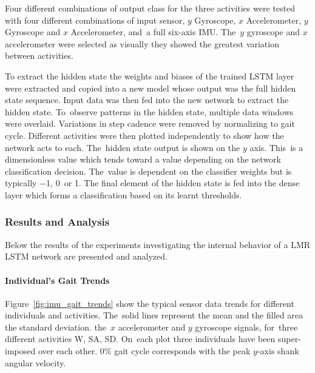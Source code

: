 Four different combinations of output class for the three activities were tested with four different combinations of input sensor, $y$ Gyroscope, $x$ Accelerometer, $y$ Gyroscope and $x$ Accelerometer, and~a full six-axis IMU. The~$y$ gyroscope and $x$ accelerometer were selected as visually they showed the greatest variation between activities.

To extract the hidden state the weights and biases of the trained LSTM layer were extracted and copied into a new model whose output was the full hidden state sequence. Input data was then fed into the new network to extract the hidden state. To~observe patterns in the hidden state, multiple data windows were overlaid. Variations in step cadence were removed by normalizing to gait cycle. Different activities were then plotted independently to show how the network acts to each. The~hidden state output is shown on the $y$ axis. This~is a dimensionless value which tends toward a value depending on the network classification decision. The~value is dependent on the classifier weights but is typically $-$1, 0~or 1.  The final element of the hidden state is fed into the dense layer which forms a classification based on its learnt thresholds.


\subsubsection{Results and Analysis}
Below the results of the experiments investigating the internal behavior of a LMR LSTM network are presented and analyzed.

\paragraph{Individual's Gait Trends}
Figure~\ref{fig:imu_gait_trends} show the typical sensor data trends for different individuals and activities. The~solid lines represent the mean and the filled area the standard deviation. the~$x$ accelerometer and $y$ gyroscope signals, for~three different activities W, SA, SD. On~each plot three individuals have been super-imposed over each other. 0\% gait cycle corresponds with the peak $y$-axis shank angular velocity.


